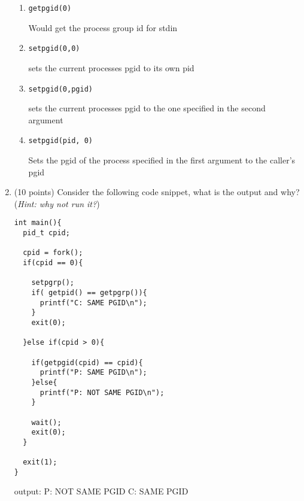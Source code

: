 \documentclass{article}[9pt]
\newenvironment{answerfont}{\fontfamily{qhv}\selectfont}{\par}
\newenvironment{myanswer}{\begin{mdframed}\begin{answerfont}}{\end{answerfont}\end{mdframed}}
\begin{document}
\begin{enumerate}
\begin{enumerate}
\item \texttt{getpgid(0)}

  \begin{myanswer}
  Would get the process group id for stdin
  \end{myanswer}

\item \texttt{setpgid(0,0)}

  \begin{myanswer}
  sets the current processes pgid to its own pid
  \end{myanswer}

\item \texttt{setpgid(0,pgid)}

  \begin{myanswer}
  sets the current processes pgid to the one specified in the second argument
  \end{myanswer}

\item \texttt{setpgid(pid, 0)}

  \begin{myanswer}
  Sets the pgid of the process specified in the first argument to the caller's pgid
  \end{myanswer}

\end{enumerate}

\item (10 points) Consider the following code snippet, what is the output and why?
(\emph{Hint: why not run it?})

\begin{verbatim}
int main(){
  pid_t cpid;

  cpid = fork();
  if(cpid == 0){

    setpgrp();
    if( getpid() == getpgrp()){
      printf("C: SAME PGID\n");
    }
    exit(0);

  }else if(cpid > 0){

    if(getpgid(cpid) == cpid){
      printf("P: SAME PGID\n");
    }else{
      printf("P: NOT SAME PGID\n");
    }

    wait();
    exit(0);
  }

  exit(1);
}
\end{verbatim}

  \begin{myanswer}
  output:
  P: NOT SAME PGID
  C: SAME PGID

  \end{myanswer}



\end{enumerate}
\end{document}
